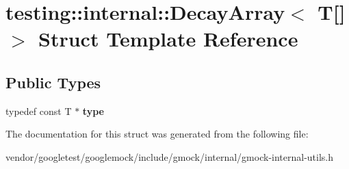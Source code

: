 \hypertarget{structtesting_1_1internal_1_1DecayArray_3_01T[]_4}{}\section{testing\+:\+:internal\+:\+:Decay\+Array$<$ T\mbox{[}\mbox{]}$>$ Struct Template Reference}
\label{structtesting_1_1internal_1_1DecayArray_3_01T[]_4}
\subsection*{Public Types}
\begin{DoxyCompactItemize}
\item 
typedef const T $\ast$ {\bfseries type}\hypertarget{structtesting_1_1internal_1_1DecayArray_3_01T[]_4_a1820b673d104b3a985faaef8db5d77d2}{}\label{structtesting_1_1internal_1_1DecayArray_3_01T[]_4_a1820b673d104b3a985faaef8db5d77d2}

\end{DoxyCompactItemize}


The documentation for this struct was generated from the following file\+:\begin{DoxyCompactItemize}
\item 
vendor/googletest/googlemock/include/gmock/internal/gmock-\/internal-\/utils.\+h\end{DoxyCompactItemize}
